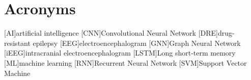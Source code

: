 
\chapter{Acronyms} \label{chap: Acronyms}

\begin{acronym}[AAAAA]
    [AI]{artificial intelligence}
    [CNN]{Convolutional Neural Network}
    [DRE]{drug-resistant epilepsy}
    [EEG]{electroencephalogram}
    [GNN]{Graph Neural Network}
    [iEEG]{intracranial electroencephalogram}
    [LSTM]{Long short-term memory}
    [ML]{machine learning}
    [RNN]{Recurrent Neural Network}
    [SVM]{Support Vector Machine}
\end{acronym}
